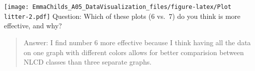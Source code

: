 \documentclass[
]{article}
\begin{document}
\texttt{[image: EmmaChilds\_A05\_DataVisualization\_files/figure-latex/Plot litter-2.pdf]}
Question: Which of these plots (6 vs.~7) do you think is more effective,
and why?

\begin{quote}
Answer: I find number 6 more effective because I think having all the
data on one graph with different colors allows for better comparision
between NLCD classes than three separate graphs.
\end{quote}
\end{document}
